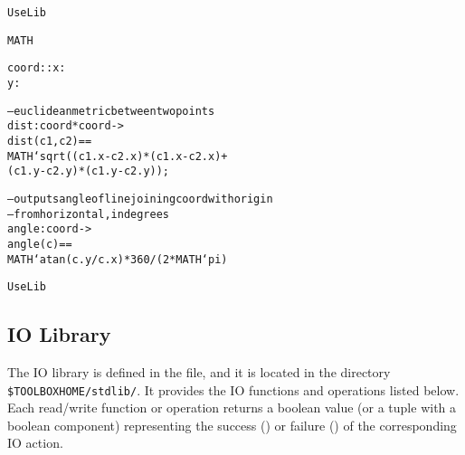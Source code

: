 \documentclass[\pformat,12pt]{article}
\begin{document}
\begin{alltt}
 UseLib

     MATH 



  coord :: x : 
           y : 


  -- euclidean metric between two points
  dist : coord * coord -> 
  dist (c1,c2) ==
    MATH`sqrt((c1.x - c2.x) * (c1.x - c2.x) +
              (c1.y - c2.y) * (c1.y - c2.y));


  -- outputs angle of line joining coord with origin
  -- from horizontal, in degrees
  angle : coord -> 
  angle (c) ==
    MATH`atan (c.y / c.x) * 360 / ( 2 * MATH`pi)

 UseLib
\end{alltt}


\subsection{IO Library}

The IO library is defined in the 
 file, and it
is located
in the directory \verb+$TOOLBOXHOME/stdlib/+.  
It provides the IO functions and
operations listed below. Each read/write function or operation returns
a boolean 
value (or a tuple with a boolean component) representing the success
() or failure () of the corresponding IO
action. 
\end{document}
